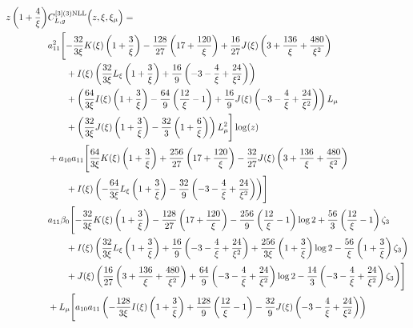 \documentclass[a4paper]{article}
\begin{document}
	\endgroup
\begingroup
\allowdisplaybreaks
\begin{align}
		z \left(1 + \frac{4}{\xi}\right) &C_{L,g}^{[3](3) \rm NLL}\Bigl(z,\xi,\xi_\mu\Bigr)=\notag \\
		& a_{11}^2 \Biggl[ -\frac{32}{3 \xi} K(\xi) \left(1 + \frac{3}{\xi}\right) - \frac{128}{27} \left(17 + \frac{120}{\xi}\right) + \frac{16}{27} J(\xi) \left(3 + \frac{136}{\xi} + \frac{480}{\xi^2}\right) \notag\\
		&\qquad + I(\xi) \left(\frac{32}{3\xi} L_\xi \left(1 + \frac{3}{\xi}\right) + \frac{16}{9} \left(-3 - \frac{4}{\xi} + \frac{24}{\xi^2}\right)\right) \notag\\
	 	& \qquad + \left(\frac{64}{3\xi} I(\xi) \left(1 + \frac{3}{\xi}\right) - \frac{64}{9} \left(\frac{12}{\xi} - 1\right) + \frac{16}{9} J(\xi) \left(-3 - \frac{4}{\xi} + \frac{24}{\xi^2}\right)\right) L_\mu \notag\\
		& \qquad + \left(\frac{32}{3\xi} J(\xi) \left(1 + \frac{3}{\xi}\right) - \frac{32}{3} \left(1 + \frac{6}{\xi}\right)\right) L_\mu^2\Biggr] \log(z) \notag\\
		& + a_{10} a_{11} \Biggl[ \frac{64}{3\xi} K(\xi) \left(1 + \frac{3}{\xi}\right) + \frac{256}{27} \left(17 + \frac{120}{\xi}\right) - \frac{32}{27} J(\xi) \left(3 + \frac{136}{\xi} + \frac{480}{\xi^2} \right) \notag\\
		& \qquad + I(\xi) \left(-\frac{64}{3\xi} L_\xi \left(1 + \frac{3}{\xi}\right) - \frac{32}{9} \left(-3 - \frac{4}{\xi} + \frac{24}{\xi^2}\right)\right)\Biggr] \notag\\
		& a_{11} \beta_0 \Biggl[-\frac{32}{3\xi} K(\xi) \left(1 + \frac{3}{\xi}\right) - \frac{128}{27} \left(17 + \frac{120}{\xi}\right) -	\frac{256}{9} \left(\frac{12}{\xi} - 1\right) \log 2 + \frac{56}{3} \left(\frac{12}{\xi} - 1\right) \zeta_3\notag \\
		& \qquad + I(\xi) \left(\frac{32}{3\xi} L_\xi \left(1 + \frac{3}{\xi}\right) + \frac{16}{9} \left(-3 - \frac{4}{\xi} + \frac{24}{\xi^2}\right) + \frac{256}{3\xi} \left(1 + \frac{3}{\xi}\right) \log 2 - \frac{56}{\xi} \left(1 + \frac{3}{\xi}\right) \zeta_3\right) \notag\\
		& \qquad + J(\xi) \left( \frac{16}{27} \left(3 + \frac{136}{\xi} + \frac{480}{\xi^2}\right) + \frac{64}{9} \left(-3 - \frac{4}{\xi} + \frac{24}{\xi^2}\right) \log 2 - \frac{14}{3} \left(-3 - \frac{4}{\xi} + \frac{24}{\xi^2}\right) \zeta_3\right)\Biggr] \notag\\
		& + L_\mu \Biggl[ a_{10} a_{11} \left(-\frac{128}{3\xi} I(\xi) \left(1 + \frac{3}{\xi}\right) + \frac{128}{9} \left(\frac{12}{\xi} - 1\right) - \frac{32}{9} J(\xi) \left(-3 - \frac{4}{\xi} + \frac{24}{\xi^2}\right)\right) \notag\\

\end{align}
\end{document}
